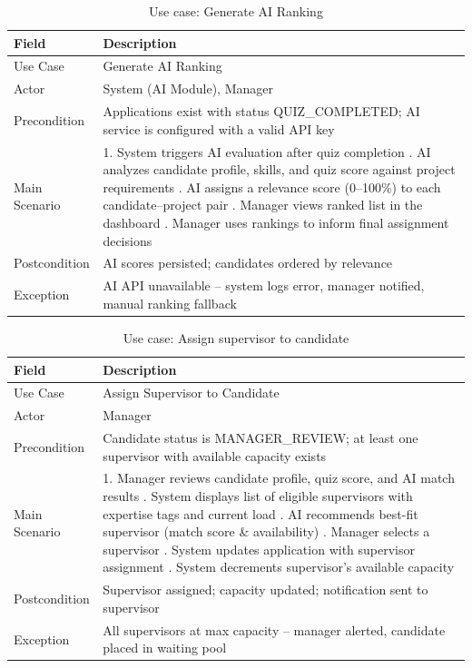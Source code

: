 \begin{table}[H]
\centering
\begin{tabular}{|p{4cm}|p{9cm}|}
\hline
\rowcolor{gray!20}
\textbf{Field} & \textbf{Description} \\
\hline
Use Case & Generate AI Ranking \\
\hline
Actor & System (AI Module), Manager \\
\hline
Precondition & Applications exist with status QUIZ\_COMPLETED; AI service is configured with a valid API key \\
\hline
Main Scenario & 1. System triggers AI evaluation after quiz completion \newline 2. AI analyzes candidate profile, skills, and quiz score against project requirements \newline 3. AI assigns a relevance score (0--100\%) to each candidate--project pair \newline 4. Manager views ranked list in the dashboard \newline 5. Manager uses rankings to inform final assignment decisions \\
\hline
Postcondition & AI scores persisted; candidates ordered by relevance \\
\hline
Exception & AI API unavailable -- system logs error, manager notified, manual ranking fallback \\
\hline
\end{tabular}
\caption{Use case: Generate AI Ranking}
\end{table}

\begin{table}[H]
\centering
\begin{tabular}{|p{4cm}|p{9cm}|}
\hline
\rowcolor{gray!20}
\textbf{Field} & \textbf{Description} \\
\hline
Use Case & Assign Supervisor to Candidate \\
\hline
Actor & Manager \\
\hline
Precondition & Candidate status is MANAGER\_REVIEW; at least one supervisor with available capacity exists \\
\hline
Main Scenario & 1. Manager reviews candidate profile, quiz score, and AI match results \newline 2. System displays list of eligible supervisors with expertise tags and current load \newline 3. AI recommends best-fit supervisor (match score \& availability) \newline 4. Manager selects a supervisor \newline 5. System updates application with supervisor assignment \newline 6. System decrements supervisor's available capacity \\
\hline
Postcondition & Supervisor assigned; capacity updated; notification sent to supervisor \\
\hline
Exception & All supervisors at max capacity -- manager alerted, candidate placed in waiting pool \\
\hline
\end{tabular}
\caption{Use case: Assign supervisor to candidate}
\end{table}

